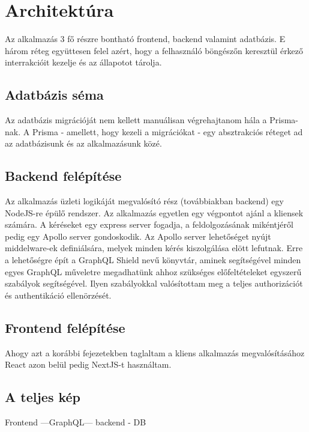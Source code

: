 \chapter{Architektúra}

Az alkalmazás 3 fő részre bontható frontend, backend valamint adatbázis.
E három réteg együttesen felel azért, hogy a felhasználó böngészőn keresztül érkező interrakcióit kezelje és az állapotot tárolja.

\section{Adatbázis séma}

Az adatbázis migrációját nem kellett manuálisan végrehajtanom hála a Prisma-nak. 
A Prisma - amellett, hogy kezeli a migrációkat - egy absztrakciós réteget ad az adatbázisunk és az alkalmazásunk közé.

\section{Backend felépítése}

Az alkalmazás üzleti logikáját megvalósító rész (továbbiakban backend) egy NodeJS-re épülő rendszer.
Az alkalmazás egyetlen egy végpontot ajánl a kliensek számára.
A kéréseket egy express server fogadja, a feldolgozásának mikéntjéről pedig egy Apollo server gondoskodik.
Az Apollo server lehetőséget nyújt middelware-ek definiálsára, melyek minden kérés kiszolgálása elött lefutnak.
Erre a lehetőségre épít a GraphQL Shield nevű könyvtár, aminek segítségével minden egyes GraphQL műveletre megadhatünk ahhoz szükséges előfeltételeket egyszerű szabályok segítségével.
Ilyen szabályokkal valósítottam meg a teljes authorizációt és authentikáció ellenörzését.

\section{Frontend felépítése}

Ahogy azt a korábbi fejezetekben taglaltam a kliens alkalmazás megvalósításához React azon belül pedig NextJS-t használtam.

\section{A teljes kép}

Frontend ---GraphQL--- backend - DB